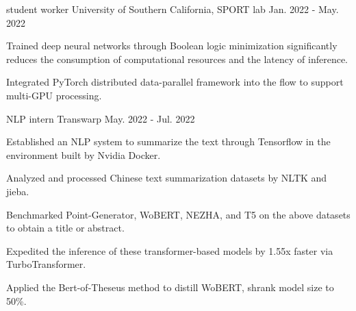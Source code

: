 
\begin{cventries}

  \cventry
    {student worker} %
    {University of Southern California, SPORT lab} %
    {} %
    {Jan. 2022 - May. 2022} %
    { 
     \begin{cvitems} %
       \item{Trained deep neural networks through Boolean logic minimization significantly reduces the consumption of computational resources and the latency of inference.}
       \item{Integrated PyTorch distributed data-parallel framework into the flow to support multi-GPU processing.}
     \end{cvitems}
    }

 \vspace{0mm} 


  \cventry
    {NLP intern} %
    {Transwarp} %
    {} %
    {May. 2022 - Jul. 2022} %
    { 
     \begin{cvitems} %
        \item{Established an NLP system to summarize the text through Tensorflow in the environment built by Nvidia Docker.}
        \item{Analyzed and processed Chinese text summarization datasets by NLTK and jieba.}
        \item{Benchmarked Point-Generator, WoBERT, NEZHA, and T5 on the above datasets to obtain a title or abstract. }
        \item{Expedited the inference of these transformer-based models by 1.55x faster via TurboTransformer.}
        \item{Applied the Bert-of-Theseus method to distill WoBERT, shrank model size to 50\%.}
    \end{cvitems}
    }

 \vspace{0mm} 
\end{cventries}
